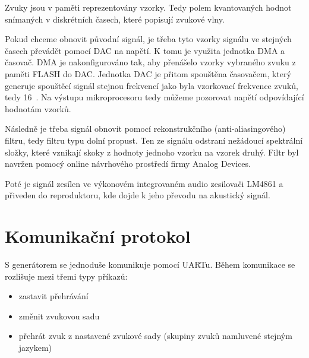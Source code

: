 Zvuky jsou v paměti reprezentovány vzorky. Tedy polem kvantovaných hodnot snímaných v diskrétních časech, které popisují zvukové vlny.

Pokud chceme obnovit původní signál, je třeba tyto vzorky signálu ve stejných časech převádět pomocí DAC na napětí. K tomu je využita jednotka DMA a časovač. DMA je nakonfigurováno tak, aby přenášelo vzorky vybraného zvuku z paměti FLASH do DAC. Jednotka DAC je přitom spouštěna časovačem, který generuje spouštěcí signál stejnou frekvencí jako byla vzorkovací frekvence zvuků, tedy 16~. Na výstupu mikroprocesoru tedy můžeme pozorovat napětí odpovídající hodnotám vzorků.

Následně je třeba signál obnovit pomocí rekonstrukčního (anti-aliasingového) filtru, tedy filtru typu dolní propust. Ten ze signálu odstraní nežádoucí spektrální složky, které vznikají skoky z hodnoty jednoho vzorku na vzorek druhý. Filtr byl navržen pomocý online návrhového prostředí firmy Analog Devices.

Poté je signál zesílen ve výkonovém integrovaném audio zesilovači LM4861 a přiveden do reproduktoru, kde dojde k jeho převodu na akustický signál.

\section{Komunikační protokol}
S generátorem se jednoduše komunikuje pomocí UARTu. Během komunikace se rozlišuje mezi třemi typy příkazů:
\begin{itemize}
    \item zastavit přehrávání
    \item změnit zvukovou sadu
    \item přehrát zvuk z nastavené zvukové sady (skupiny zvuků namluvené stejným jazykem)
\end{itemize}


